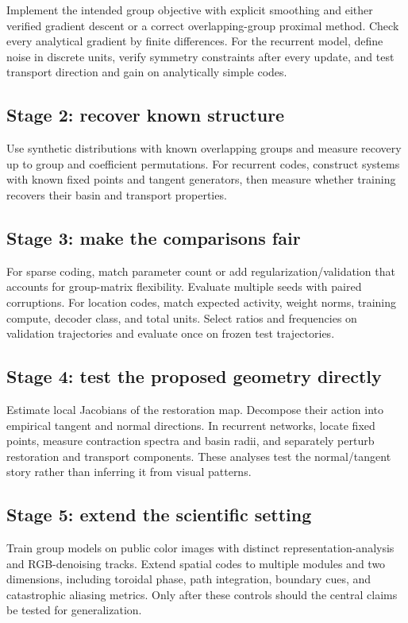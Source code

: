 Implement the intended group objective with explicit smoothing and either verified gradient descent or a correct overlapping-group proximal method. Check every analytical gradient by finite differences. For the recurrent model, define noise in discrete units, verify symmetry constraints after every update, and test transport direction and gain on analytically simple codes.

\subsection{Stage 2: recover known structure}

Use synthetic distributions with known overlapping groups and measure recovery up to group and coefficient permutations. For recurrent codes, construct systems with known fixed points and tangent generators, then measure whether training recovers their basin and transport properties.

\subsection{Stage 3: make the comparisons fair}

For sparse coding, match parameter count or add regularization/validation that accounts for group-matrix flexibility. Evaluate multiple seeds with paired corruptions. For location codes, match expected activity, weight norms, training compute, decoder class, and total units. Select ratios and frequencies on validation trajectories and evaluate once on frozen test trajectories.

\subsection{Stage 4: test the proposed geometry directly}

Estimate local Jacobians of the restoration map. Decompose their action into empirical tangent and normal directions. In recurrent networks, locate fixed points, measure contraction spectra and basin radii, and separately perturb restoration and transport components. These analyses test the normal/tangent story rather than inferring it from visual patterns.

\subsection{Stage 5: extend the scientific setting}

Train group models on public color images with distinct representation-analysis and RGB-denoising tracks. Extend spatial codes to multiple modules and two dimensions, including toroidal phase, path integration, boundary cues, and catastrophic aliasing metrics. Only after these controls should the central claims be tested for generalization.

